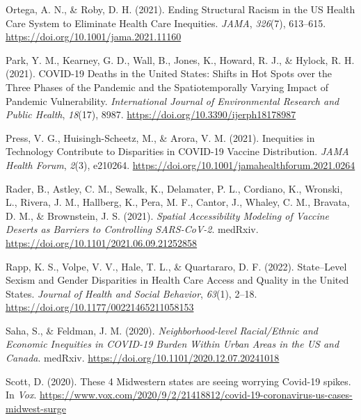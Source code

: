 \documentclass[
]{article}
\newlength{\cslhangindent}
\newlength{\cslentryspacingunit} %
\newenvironment{CSLReferences}[2] %
 {%
  \setlength{\parindent}{0pt}
  \ifodd #1
  \let\oldpar\par
  \def\par{\hangindent=\cslhangindent\oldpar}
  \fi
  \setlength{\parskip}{#2\cslentryspacingunit}
 }%
 {}
\begin{document}
\begin{CSLReferences}{1}{0}
\leavevmode{}%
Ortega, A. N., \& Roby, D. H. (2021). Ending {Structural} {Racism} in the {US} {Health} {Care} {System} to {Eliminate} {Health} {Care} {Inequities}. \emph{JAMA}, \emph{326}(7), 613--615. \url{https://doi.org/10.1001/jama.2021.11160}

\leavevmode{}%
Park, Y. M., Kearney, G. D., Wall, B., Jones, K., Howard, R. J., \& Hylock, R. H. (2021). {COVID}-19 {Deaths} in the {United} {States}: {Shifts} in {Hot} {Spots} over the {Three} {Phases} of the {Pandemic} and the {Spatiotemporally} {Varying} {Impact} of {Pandemic} {Vulnerability}. \emph{International Journal of Environmental Research and Public Health}, \emph{18}(17), 8987. \url{https://doi.org/10.3390/ijerph18178987}

\leavevmode{}%
Press, V. G., Huisingh-Scheetz, M., \& Arora, V. M. (2021). Inequities in {Technology} {Contribute} to {Disparities} in {COVID}-19 {Vaccine} {Distribution}. \emph{JAMA Health Forum}, \emph{2}(3), e210264. \url{https://doi.org/10.1001/jamahealthforum.2021.0264}

\leavevmode{}%
Rader, B., Astley, C. M., Sewalk, K., Delamater, P. L., Cordiano, K., Wronski, L., Rivera, J. M., Hallberg, K., Pera, M. F., Cantor, J., Whaley, C. M., Bravata, D. M., \& Brownstein, J. S. (2021). \emph{Spatial {Accessibility} {Modeling} of {Vaccine} {Deserts} as {Barriers} to {Controlling} {SARS}-{CoV}-2}. medRxiv. \url{https://doi.org/10.1101/2021.06.09.21252858}

\leavevmode{}%
Rapp, K. S., Volpe, V. V., Hale, T. L., \& Quartararo, D. F. (2022). State--{Level} {Sexism} and {Gender} {Disparities} in {Health} {Care} {Access} and {Quality} in the {United} {States}. \emph{Journal of Health and Social Behavior}, \emph{63}(1), 2--18. \url{https://doi.org/10.1177/00221465211058153}

\leavevmode{}%
Saha, S., \& Feldman, J. M. (2020). \emph{Neighborhood-level {Racial}/{Ethnic} and {Economic} {Inequities} in {COVID}-19 {Burden} {Within} {Urban} {Areas} in the {US} and {Canada}}. medRxiv. \url{https://doi.org/10.1101/2020.12.07.20241018}

\leavevmode{}%
Scott, D. (2020). These 4 {Midwestern} states are seeing worrying {Covid}-19 spikes. In \emph{Vox}. \url{https://www.vox.com/2020/9/2/21418812/covid-19-coronavirus-us-cases-midwest-surge}


\end{CSLReferences}
\end{document}
